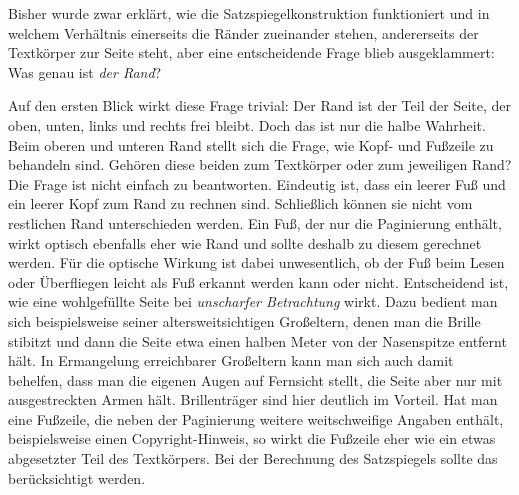 \begin{Declaration}
\end{Declaration}%
\begin{Explain}%
  Bisher wurde zwar erklärt, wie die
  Satzspiegelkonstruktion funktioniert und in welchem
  Verhältnis einerseits die Ränder zueinander stehen, andererseits
  der Textkörper zur Seite steht, aber eine entscheidende Frage blieb
  ausgeklammert: Was genau ist \emph{der Rand}?

  Auf den ersten Blick wirkt diese Frage trivial: Der Rand ist der Teil der
  Seite, der oben, unten, links und rechts frei bleibt. Doch das ist nur die
  halbe Wahrheit. Beim oberen und unteren Rand stellt sich die Frage, wie
  Kopf- und Fußzeile zu behandeln
  sind.  Gehören diese beiden zum Textkörper oder zum jeweiligen Rand? Die
  Frage ist nicht einfach zu beantworten.  Eindeutig ist, dass ein leerer Fuß
  und ein leerer Kopf zum Rand zu rechnen sind. Schließlich können sie nicht
  vom restlichen Rand unterschieden werden. Ein Fuß, der nur die
  Paginierung
  \iffalse %
  \unskip\footnote{Unter der Paginierung versteht man die Angabe der
    Seitenzahl, wahlweise innerhalb oder außerhalb des Satzspiegels, meist im
    Kopf oder Fuß der Seite.} %
  \fi enthält, wirkt optisch ebenfalls eher wie Rand und sollte deshalb zu
  diesem gerechnet werden. Für die optische Wirkung ist dabei unwesentlich, ob
  der Fuß beim Lesen oder Überfliegen leicht als Fuß erkannt werden kann oder
  nicht. Entscheidend ist, wie eine wohlgefüllte Seite bei \emph{unscharfer
    Betrachtung} wirkt. Dazu bedient man sich beispielsweise seiner
  altersweitsichtigen Großeltern, denen man die Brille stibitzt und dann die
  Seite etwa einen halben Meter von der Nasenspitze entfernt hält. In
  Ermangelung erreichbarer Großeltern kann man sich auch damit behelfen, dass
  man die eigenen Augen auf Fernsicht stellt, die Seite aber nur mit
  ausgestreckten Armen hält. Brillenträger sind hier deutlich im Vorteil. Hat
  man eine Fußzeile, die neben der Paginierung weitere weitschweifige Angaben
  enthält, beispielsweise einen Copyright-Hinweis, so wirkt die Fußzeile eher
  wie ein etwas abgesetzter Teil des Textkörpers. Bei der Berechnung des
  Satzspiegels sollte das berücksichtigt werden.
  

\end{Explain}
